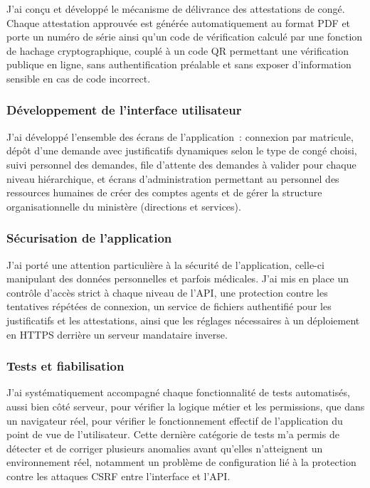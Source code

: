 \documentclass[12pt,a4paper]{article}
\begin{document}
J'ai conçu et développé le mécanisme de délivrance des attestations de congé. Chaque attestation approuvée est générée automatiquement au format PDF et porte un numéro de série ainsi qu'un code de vérification calculé par une fonction de hachage cryptographique, couplé à un code QR permettant une vérification publique en ligne, sans authentification préalable et sans exposer d'information sensible en cas de code incorrect.

\subsubsection{Développement de l'interface utilisateur}

J'ai développé l'ensemble des écrans de l'application~: connexion par matricule, dépôt d'une demande avec justificatifs dynamiques selon le type de congé choisi, suivi personnel des demandes, file d'attente des demandes à valider pour chaque niveau hiérarchique, et écrans d'administration permettant au personnel des ressources humaines de créer des comptes agents et de gérer la structure organisationnelle du ministère (directions et services).

\subsubsection{Sécurisation de l'application}

J'ai porté une attention particulière à la sécurité de l'application, celle-ci manipulant des données personnelles et parfois médicales. J'ai mis en place un contrôle d'accès strict à chaque niveau de l'API, une protection contre les tentatives répétées de connexion, un service de fichiers authentifié pour les justificatifs et les attestations, ainsi que les réglages nécessaires à un déploiement en HTTPS derrière un serveur mandataire inverse.

\subsubsection{Tests et fiabilisation}

J'ai systématiquement accompagné chaque fonctionnalité de tests automatisés, aussi bien côté serveur, pour vérifier la logique métier et les permissions, que dans un navigateur réel, pour vérifier le fonctionnement effectif de l'application du point de vue de l'utilisateur. Cette dernière catégorie de tests m'a permis de détecter et de corriger plusieurs anomalies avant qu'elles n'atteignent un environnement réel, notamment un problème de configuration lié à la protection contre les attaques CSRF entre l'interface et l'API.
\end{document}
